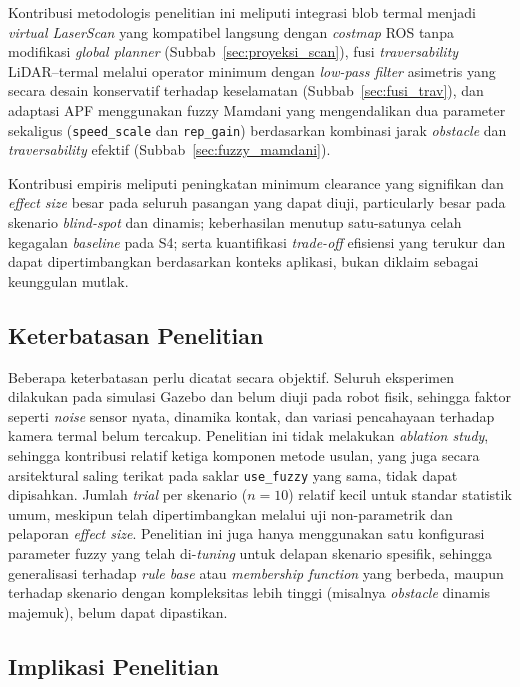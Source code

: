 Kontribusi metodologis penelitian ini meliputi integrasi blob termal menjadi
\textit{virtual LaserScan} yang kompatibel langsung dengan \textit{costmap}
ROS tanpa modifikasi \textit{global planner} (Subbab~\ref{sec:proyeksi_scan}),
fusi \textit{traversability} LiDAR--termal melalui operator minimum dengan
\textit{low-pass filter} asimetris yang secara desain konservatif terhadap
keselamatan (Subbab~\ref{sec:fusi_trav}), dan adaptasi APF menggunakan fuzzy
Mamdani yang mengendalikan dua parameter sekaligus (\texttt{speed\_scale} dan
\texttt{rep\_gain}) berdasarkan kombinasi jarak \textit{obstacle} dan
\textit{traversability} efektif (Subbab~\ref{sec:fuzzy_mamdani}).

Kontribusi empiris meliputi peningkatan minimum clearance yang signifikan
dan \textit{effect size} besar pada seluruh pasangan yang dapat diuji,
particularly besar pada skenario \textit{blind-spot} dan dinamis;
keberhasilan menutup satu-satunya celah kegagalan \textit{baseline} pada S4;
serta kuantifikasi \textit{trade-off} efisiensi yang terukur dan dapat
dipertimbangkan berdasarkan konteks aplikasi, bukan diklaim sebagai
keunggulan mutlak.

\subsection{Keterbatasan Penelitian}

Beberapa keterbatasan perlu dicatat secara objektif. Seluruh eksperimen
dilakukan pada simulasi Gazebo dan belum diuji pada robot fisik, sehingga
faktor seperti \textit{noise} sensor nyata, dinamika kontak, dan variasi
pencahayaan terhadap kamera termal belum tercakup. Penelitian ini tidak
melakukan \textit{ablation study}, sehingga kontribusi relatif ketiga
komponen metode usulan, yang juga secara arsitektural saling terikat pada
saklar \texttt{use\_fuzzy} yang sama, tidak dapat dipisahkan. Jumlah
\textit{trial} per skenario ($n=10$) relatif kecil untuk standar statistik
umum, meskipun telah dipertimbangkan melalui uji non-parametrik dan
pelaporan \textit{effect size}. Penelitian ini juga hanya menggunakan satu
konfigurasi parameter fuzzy yang telah di-\textit{tuning} untuk delapan
skenario spesifik, sehingga generalisasi terhadap \textit{rule base} atau
\textit{membership function} yang berbeda, maupun terhadap skenario dengan
kompleksitas lebih tinggi (misalnya \textit{obstacle} dinamis majemuk),
belum dapat dipastikan.

\subsection{Implikasi Penelitian}

